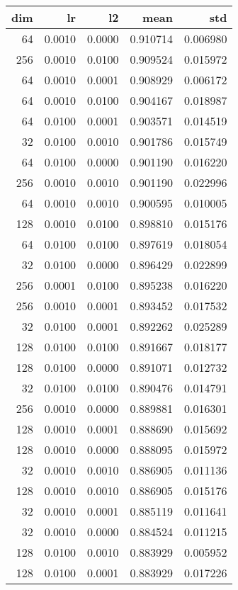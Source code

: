 \begin{tabular}{rrrrr}
\toprule
 dim &      lr &      l2 &      mean &       std \\
\midrule
  64 &  0.0010 &  0.0000 &  0.910714 &  0.006980 \\
 256 &  0.0010 &  0.0100 &  0.909524 &  0.015972 \\
  64 &  0.0010 &  0.0001 &  0.908929 &  0.006172 \\
  64 &  0.0010 &  0.0100 &  0.904167 &  0.018987 \\
  64 &  0.0100 &  0.0001 &  0.903571 &  0.014519 \\
  32 &  0.0100 &  0.0010 &  0.901786 &  0.015749 \\
  64 &  0.0100 &  0.0000 &  0.901190 &  0.016220 \\
 256 &  0.0010 &  0.0010 &  0.901190 &  0.022996 \\
  64 &  0.0010 &  0.0010 &  0.900595 &  0.010005 \\
 128 &  0.0010 &  0.0100 &  0.898810 &  0.015176 \\
  64 &  0.0100 &  0.0100 &  0.897619 &  0.018054 \\
  32 &  0.0100 &  0.0000 &  0.896429 &  0.022899 \\
 256 &  0.0001 &  0.0100 &  0.895238 &  0.016220 \\
 256 &  0.0010 &  0.0001 &  0.893452 &  0.017532 \\
  32 &  0.0100 &  0.0001 &  0.892262 &  0.025289 \\
 128 &  0.0100 &  0.0100 &  0.891667 &  0.018177 \\
 128 &  0.0100 &  0.0000 &  0.891071 &  0.012732 \\
  32 &  0.0100 &  0.0100 &  0.890476 &  0.014791 \\
 256 &  0.0010 &  0.0000 &  0.889881 &  0.016301 \\
 128 &  0.0010 &  0.0001 &  0.888690 &  0.015692 \\
 128 &  0.0010 &  0.0000 &  0.888095 &  0.015972 \\
  32 &  0.0010 &  0.0010 &  0.886905 &  0.011136 \\
 128 &  0.0010 &  0.0010 &  0.886905 &  0.015176 \\
  32 &  0.0010 &  0.0001 &  0.885119 &  0.011641 \\
  32 &  0.0010 &  0.0000 &  0.884524 &  0.011215 \\
 128 &  0.0100 &  0.0010 &  0.883929 &  0.005952 \\
 128 &  0.0100 &  0.0001 &  0.883929 &  0.017226 \\

\end{tabular}
